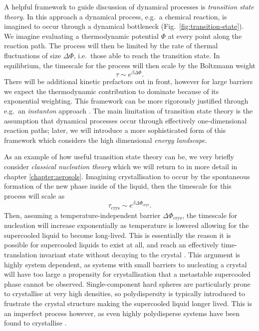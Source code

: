 A helpful framework to guide discussion of dynamical processes is \emph{transition state theory}.
In this approach a dynamical process, e.g.\ a chemical reaction, is imagined to occur through a dynamical bottleneck (Fig.\ \ref{fig:transition-state}).
We imagine evaluating a thermodynamic potential%
$\Phi$ at every point along the reaction path.
The process will then be limited by the rate of thermal fluctuations of size $\Delta \Phi$, i.e.\ those able to reach the transition state.
In equilibrium, the timescale for the process will then scale by the Boltzmann weight
\begin{equation}\label{eq:reaction-time}
  \tau \sim e^{\beta \Delta \Phi}.
\end{equation}
There will be additional kinetic prefactors out in front, however for large barriers we expect the thermodynamic contribution to dominate because of its exponential weighting.
This framework can be more rigorously justified through e.g.\ an \emph{instanton} approach \cite{LangerAP1969}.
The main limitation of transition state theory is the assumption that dynamical processes occur through effectively one-dimensional reaction paths; later, we will introduce a more sophisticated form of this framework which considers the high dimensional \emph{energy landscape}.

As an example of how useful transition state theory can be, we very briefly consider \emph{classical nucleation theory} which we will return to in more detail in chapter \ref{chapter:aerosols}.
Imagining crystallisation to occur by the spontaneous formation of the new phase inside of the liquid, then the timescale for this process will scale as
\begin{equation*}
  \tau_\mathrm{crys} \sim e^{ \beta \Delta \Phi_\mathrm{crys}}.
\end{equation*}
Then, assuming a temperature-independent barrier $\Delta \Phi_\mathrm{crys}$, the timescale for nucleation will increase exponentially as temperature is lowered allowing for the supercooled liquid to become long-lived.
This is essentially the reason it is possible for supercooled liquids to exist at all, and reach an effectively time-translation invariant state without decaying to the crystal \cite{CavagnaPR2009}.
This argument is highly system dependent, as systems with small barriers to nucleating a crystal will have too large a propensity for crystallisation that a metastable supercooled phase cannot be observed.
Single-component hard spheres are particularly prone to crystallise at very high densities, so polydispersity is typically introduced to frustrate the crystal structure making the supercooled liquid longer lived.
This is an imperfect process however, as even highly polydisperse systems have been found to crystallise \cite{BommineniPRL2019,BerthierPRL2016}.

